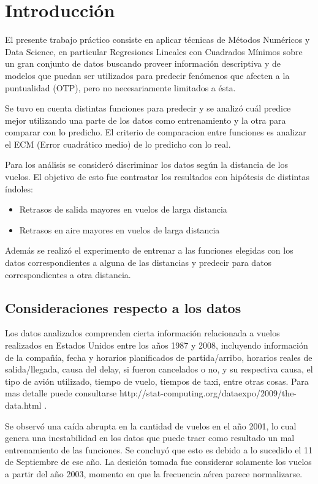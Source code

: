 \section{Introducción}

El presente trabajo práctico consiste en aplicar técnicas de Métodos Numéricos y Data Science, en particular Regresiones Lineales con Cuadrados Mínimos sobre un gran conjunto de datos buscando proveer información descriptiva y de modelos que puedan ser utilizados para predecir fenómenos que afecten a la puntualidad (OTP), pero no necesariamente limitados a ésta.


Se tuvo en cuenta distintas funciones para predecir y se analizó cuál predice mejor utilizando una parte de los datos como entrenamiento y la otra para comparar con lo predicho. El criterio de comparacion entre funciones es analizar el ECM (Error cuadrático medio) de lo predicho con lo real.


Para los análisis se consideró discriminar los datos según la distancia de los vuelos. El objetivo de esto fue contrastar los resultados con hipótesis de distintas índoles:

\begin{itemize}
\item Retrasos de salida mayores en vuelos de larga distancia
\item Retrasos en aire mayores en vuelos de larga distancia
\end{itemize}

Además se realizó el experimento de entrenar a las funciones elegidas con los datos correspondientes a alguna de las distancias y predecir para datos correspondientes a otra distancia.


\subsection{Consideraciones respecto a los datos}

Los datos analizados comprenden cierta información relacionada a vuelos realizados en Estados Unidos entre los años 1987 y 2008, incluyendo información de la compañía, fecha y horarios planificados de partida/arribo, horarios reales de salida/llegada, causa del delay, si fueron cancelados o no, y su respectiva causa, el tipo de avión utilizado, tiempo de vuelo, tiempos de taxi, entre otras cosas. Para mas detalle puede consultarse http://stat-computing.org/dataexpo/2009/the-data.html .%

Se observó una caída abrupta en la cantidad de vuelos en el año 2001, lo cual genera una inestabilidad en los datos que puede traer como resultado un mal entrenamiento de las funciones. Se concluyó que esto es debido a lo sucedido el 11 de Septiembre de ese año. La desición tomada fue considerar solamente los vuelos a partir del año 2003, momento en que la frecuencia aérea parece normalizarse.